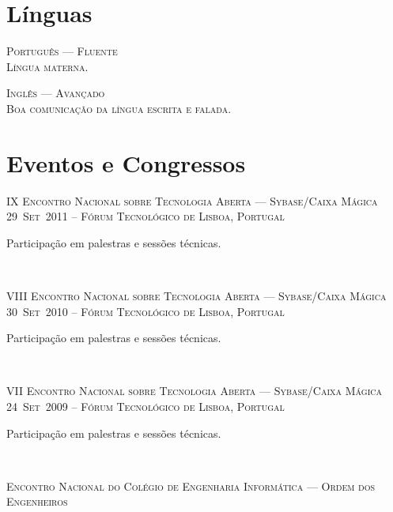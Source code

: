 \documentclass[a4paper,fontsize=10pt]{scrartcl} %
\begin{document}
\begin{minipage}[t]{0.46\textwidth}
\section{Línguas}
\textsc{Português --- Fluente}\\
\small\textsc{Língua materna.}
\\\par
\textsc{Inglês --- Avançado}\\
\small\textsc{Boa comunicação da língua escrita e falada.}
\\\par
\section{Eventos e Congressos}
\textsc{IX Encontro Nacional sobre Tecnologia Aberta --- Sybase/Caixa Mágica}\\
\small\textsc{29~Set~2011 -- Fórum Tecnológico de Lisboa, Portugal}\\ \normalsize
 \begin{inparaitem}
 	\item[] Participação em palestras e sessões técnicas.
 \end{inparaitem}
\\\par
\textsc{VIII Encontro Nacional sobre Tecnologia Aberta --- Sybase/Caixa Mágica}\\
\small\textsc{30~Set~2010 -- Fórum Tecnológico de Lisboa, Portugal}\\ \normalsize
 \begin{inparaitem}
 	\item[] Participação em palestras e sessões técnicas.
 \end{inparaitem}
\\\par
\textsc{VII Encontro Nacional sobre Tecnologia Aberta --- Sybase/Caixa Mágica}\\
\small\textsc{24~Set~2009 -- Fórum Tecnológico de Lisboa, Portugal}\\ \normalsize
 \begin{inparaitem}
 	\item[] Participação em palestras e sessões técnicas.
 \end{inparaitem}
\\\par
\textsc{Encontro Nacional do Colégio de Engenharia Informática --- Ordem dos Engenheiros}\\

\end{minipage}
\end{document}
